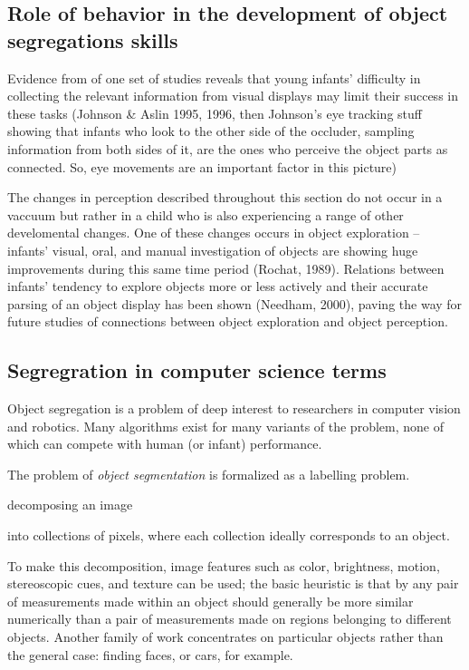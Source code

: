 \subsection{Role of behavior in the development of object segregations skills}

Evidence from of one set of studies reveals that young
infants' difficulty in collecting the relevant information
from visual displays may limit their success in these tasks (Johnson \&
Aslin 1995, 1996, then Johnson's eye tracking stuff showing
that infants who look to the other side of the occluder, sampling
information from both sides of it, are the ones who perceive the
object parts as connected.  So, eye movements are an important factor
in this picture)

The changes in perception described throughout this section
do not occur in a vaccuum but rather in a
child who is also experiencing a range of other develomental changes.
One of these changes occurs in object
exploration -- infants' visual, oral, and manual
investigation of objects are showing huge improvements during this
same time period (Rochat, 1989).  Relations between infants'
tendency to explore objects more or less actively and their accurate
parsing of an object display has been shown (Needham, 2000), paving
the way for future studies of connections between object exploration
and object perception.



\subsection{Segregration in computer science terms}

Object segregation is a problem of deep interest to 
researchers in computer vision and robotics.  Many
algorithms exist for many variants of the problem,
none of which can compete with human (or infant)
performance.

The problem of {\em object segmentation} is formalized as
a labelling problem.

decomposing an image

 into collections of pixels, where each collection
ideally corresponds to an object.


To make this decomposition, image
features such as color, brightness, motion, stereoscopic cues, and
texture can be used; the basic heuristic is that by any pair of
measurements made within an object should generally be more similar
numerically than a pair of measurements made on regions belonging to
different objects.  Another family of work concentrates on particular
objects rather than the general case: finding faces, or cars, for
example.

